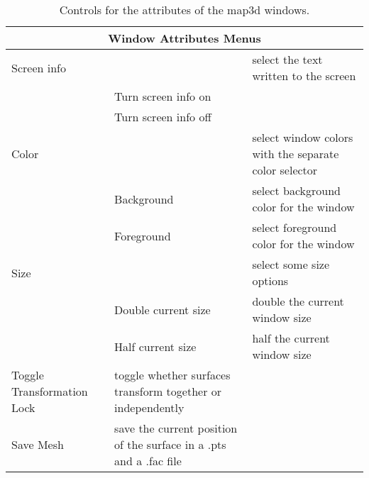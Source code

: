 \begin{table}[ht]
  \begin{center}
    \begin{tabular}{|l|l|p{3 in}|} \hline
      \multicolumn{3}{|c|}{Window Attributes Menus} \\ \hline
    Screen info & & select the text written to the screen\\
      & Turn screen info on & \\
      & Turn screen info off & \\ \hline
    Color & & select window colors with the separate color selector \\
      & Background & select background color for the window \\
      & Foreground & select foreground color for the window \\ \hline
    Size & & select some size options \\
      & Double current size & double the current window size \\
      & Half current size & half the current window size \\ \hline
    Toggle Transformation Lock & toggle whether surfaces transform 
	together or independently \\ \hline
    Save Mesh & save the current position of the surface in a .pts and a .fac
	file \\ \hline
    \end{tabular}
  \end{center}
\caption{Controls for the attributes of the map3d windows.}
\end{table}




